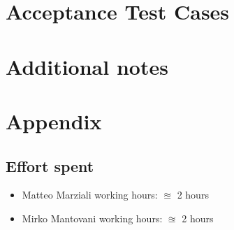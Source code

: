 \documentclass{article}
\begin{document}
\clearpage
\section{Acceptance Test Cases}


\clearpage
\section{Additional notes}




\clearpage
\section{Appendix}

\subsection{Effort spent}
\begin{itemize}

\item Matteo Marziali working hours:  $\approxeq$ 2 hours

\item Mirko Mantovani working hours:  $\approxeq$ 2 hours



\end{itemize}
\end{document}
